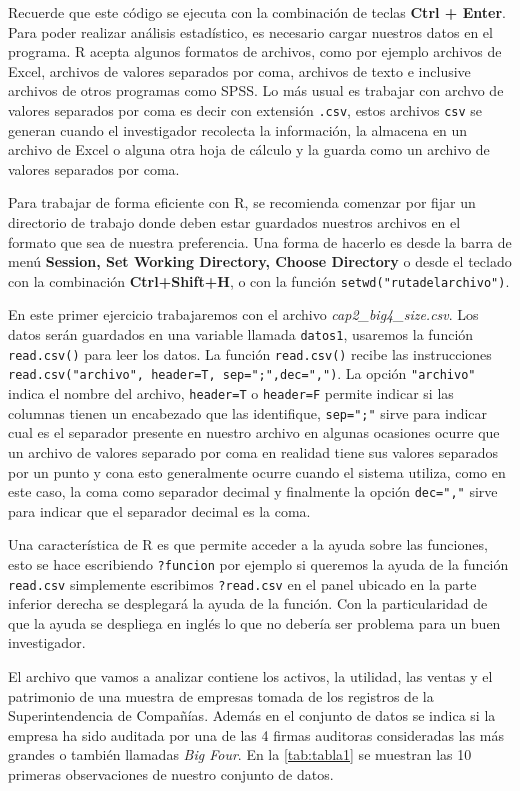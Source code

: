 \documentclass[]{book}
\begin{document}
Recuerde que este código se ejecuta con la combinación de teclas
\textbf{Ctrl + Enter}. Para poder realizar análisis estadístico, es
necesario cargar nuestros datos en el programa. R acepta algunos
formatos de archivos, como por ejemplo archivos de Excel, archivos de
valores separados por coma, archivos de texto e inclusive archivos de
otros programas como SPSS. Lo más usual es trabajar con archvo de
valores separados por coma es decir con extensión \texttt{.csv}, estos
archivos \texttt{csv} se generan cuando el investigador recolecta la
información, la almacena en un archivo de Excel o alguna otra hoja de
cálculo y la guarda como un archivo de valores separados por coma.

Para trabajar de forma eficiente con R, se recomienda comenzar por fijar
un directorio de trabajo donde deben estar guardados nuestros archivos
en el formato que sea de nuestra preferencia. Una forma de hacerlo es
desde la barra de menú \textbf{Session, Set Working Directory, Choose
Directory} o desde el teclado con la combinación \textbf{Ctrl+Shift+H},
o con la función \texttt{setwd("rutadelarchivo")}.

En este primer ejercicio trabajaremos con el archivo
\emph{cap2\_big4\_size.csv}. Los datos serán guardados en una variable
llamada \texttt{datos1}, usaremos la función \texttt{read.csv()} para
leer los datos. La función \texttt{read.csv()} recibe las instrucciones
\texttt{read.csv("archivo",\ header=T,\ sep=";",dec=",")}. La opción
\texttt{"archivo"} indica el nombre del archivo, \texttt{header=T} o
\texttt{header=F} permite indicar si las columnas tienen un encabezado
que las identifique, \texttt{sep=";"} sirve para indicar cual es el
separador presente en nuestro archivo en algunas ocasiones ocurre que un
archivo de valores separado por coma en realidad tiene sus valores
separados por un punto y cona esto generalmente ocurre cuando el sistema
utiliza, como en este caso, la coma como separador decimal y finalmente
la opción \texttt{dec=","} sirve para indicar que el separador decimal
es la coma.

Una característica de R es que permite acceder a la ayuda sobre las
funciones, esto se hace escribiendo \texttt{?funcion} por ejemplo si
queremos la ayuda de la función \texttt{read.csv} simplemente escribimos
\texttt{?read.csv} en el panel ubicado en la parte inferior derecha se
desplegará la ayuda de la función. Con la particularidad de que la ayuda
se despliega en inglés lo que no debería ser problema para un buen
investigador.

El archivo que vamos a analizar contiene los activos, la utilidad, las
ventas y el patrimonio de una muestra de empresas tomada de los
registros de la Superintendencia de Compañías. Además en el conjunto de
datos se indica si la empresa ha sido auditada por una de las 4 firmas
auditoras consideradas las más grandes o también llamadas
\emph{\emph{Big Four}}. En la \ref{tab:tabla1} se muestran las 10
primeras observaciones de nuestro conjunto de datos.
\end{document}
